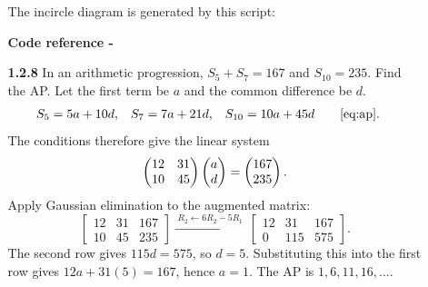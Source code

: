 \begin{enumerate}[label={},leftmargin=0pt]
\begin{enumerate}[label={},leftmargin=4mm,itemsep=9pt]
The incircle diagram is generated by this script:
\par\smallskip
\noindent\textbf{Code reference -}
\par\noindent{}
\par\smallskip
\newpage
\setcounter{enumii}{8}
\setcounter{equation}{0}
\item[\textbf{1.2.8}] In an arithmetic progression, $S_5+S_7=167$ and $S_{10}=235$. Find the AP.
\solution Let the first term be $a$ and the common difference be $d$.
\begin{align*}
S_5&=5a+10d, & S_7&=7a+21d, & S_{10}&=10a+45d\qquad\eqref{eq:ap}.
\end{align*}
The conditions therefore give the linear system
\begin{equation*}
\begin{pmatrix}12&31\\10&45\end{pmatrix}\begin{pmatrix}a\\d\end{pmatrix}=\begin{pmatrix}167\\235\end{pmatrix}.
\end{equation*}
Apply Gaussian elimination to the augmented matrix:
\begin{equation*}
\left[\begin{array}{cc|c}12&31&167\\10&45&235\end{array}\right]
\xrightarrow{\;R_2\leftarrow6R_2-5R_1\;}
\left[\begin{array}{cc|c}12&31&167\\0&115&575\end{array}\right].
\end{equation*}
The second row gives $115d=575$, so $d=5$. Substituting this into the first row gives $12a+31(5)=167$, hence $a=1$. The AP is $1,6,11,16,\ldots$.




\end{enumerate}
\end{enumerate}
